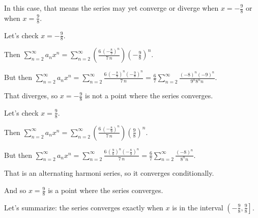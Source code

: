 \documentclass{ximera}
\begin{document}
\begin{question}
\begin{solution}
\begin{hint}
      In this case, that means the series may yet converge or diverge when \(x = -\displaystyle\frac{9}{8}\) or when \(x = \displaystyle\frac{9}{8}\).
    \end{hint}
    \begin{hint}
      Let's check \(x = -\displaystyle\frac{9}{8}\).
    \end{hint}
    \begin{hint}
      Then \(\displaystyle\sum_{n=2}^\infty a_{n} x^{n} = \displaystyle\sum_{n=2}^\infty \left( \displaystyle\frac{6 \, \left(-\displaystyle\frac{8}{9}\right)^{n}}{7 \, n} \right) \left( -\displaystyle\frac{9}{8} 
      \right)^{n}\).
    \end{hint}
    \begin{hint}
      But then \(\displaystyle\sum_{n=2}^\infty a_{n} x^{n} = \displaystyle\sum_{n=2}^\infty \displaystyle\frac{6 \, \left(-\displaystyle\frac{8}{9}\right)^{n} \left(-\displaystyle\frac{9}{8}\right)^{n}}{7 \, n} = \displaystyle\frac{6}{7} \displaystyle\sum_{n=2}^\infty \displaystyle\frac{\left(-8\right)^{n} \left(-9\right)^{n}}{9^{n} 8^{n} n}\).
    \end{hint}
    \begin{hint}
      That diverges, so \(x = -\displaystyle\frac{9}{8}\) is not a point where the series converges.
    \end{hint}
    \begin{hint}
      Let's check \(x = \displaystyle\frac{9}{8}\).
    \end{hint}
    \begin{hint}
      Then \(\displaystyle\sum_{n=2}^\infty a_{n} x^{n} = \displaystyle\sum_{n=2}^\infty \left( \displaystyle\frac{6 \, \left(-\displaystyle\frac{8}{9}\right)^{n}}{7 \, n} \right) \left( \displaystyle\frac{9}{8} 
      \right)^{n}\).
    \end{hint}
    \begin{hint}
      But then \(\displaystyle\sum_{n=2}^\infty a_{n} x^{n} = \displaystyle\sum_{n=2}^\infty \displaystyle\frac{6 \, \left(\displaystyle\frac{9}{8}\right)^{n} \left(-\displaystyle\frac{8}{9}\right)^{n}}{7 \, n} = \displaystyle\frac{6}{7} \displaystyle\sum_{n=2}^\infty \displaystyle\frac{\left(-8\right)^{n}}{8^{n} n}\).
    \end{hint}
    \begin{hint}
      That is an alternating harmoni series, so it converges conditionally.
    \end{hint}
    \begin{hint}
      And so \(x = \displaystyle\frac{9}{8}\) is a point where the series converges.
    \end{hint}
    \begin{hint}
      Let's summarize: the series converges exactly when \(x\) is in the interval \(\left( -\displaystyle\frac{9}{8} , \displaystyle\frac{9}{8} \right] \).
    \end{hint}


\end{solution}
\end{question}
\end{document}
